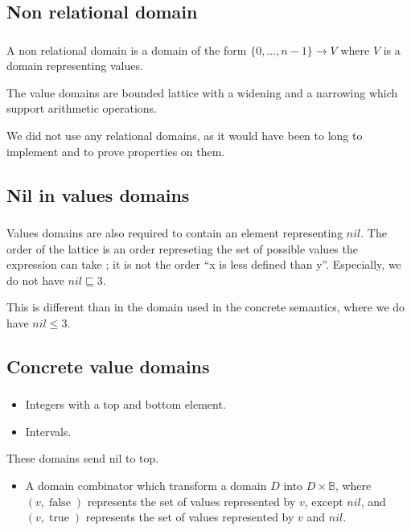 \documentclass[professionalfonts]{beamer}
\makeatletter
\newcommand*{\currentname}{\@currentlabelname}
\def\ft{\frametitle{\currentname}}
\makeatother
\begin{document}
\subsection{Non relational domain}
\begin{frame}
  \ft{}
  A non relational domain is a domain of the form
  $\{0, \dots, n-1\} \to V$ where $V$ is a domain
  representing values.

  The value domains are bounded lattice with a widening
  and a narrowing which support arithmetic operations.

  We did not use any relational domains, as it would have
  been to long to implement and to prove properties on them.
\end{frame}

\subsection{Nil in values domains}
\begin{frame}
  \ft{} Values domains are also required to contain an element representing $nil$. The order of
  the lattice is an order represeting the set of possible values the expression can take ; it is
  not the order ``x is less defined than y''. Especially, we do not have $nil \sqsubseteq 3$.

  This is different than in the domain used in the concrete semantics, where we do have
  \(nil \leq 3\).
\end{frame}

\subsection{Concrete value domains}
\begin{frame}
  \ft{}

  \begin{itemize}
  \item Integers with a top and bottom element.
  \item Intervals.
  \end{itemize}
  These domains send nil to top.
  \begin{itemize}
  \item A domain combinator which transform a domain $D$ into $D \times \mathbb{B}$, where
    $(v, \operatorname{false})$ represents the set of values represented by $v$, except $nil$,
    and $(v, \operatorname{true})$ represents the set of values represented by $v$ and $nil$.
  \end{itemize}
\end{frame}
\end{document}
